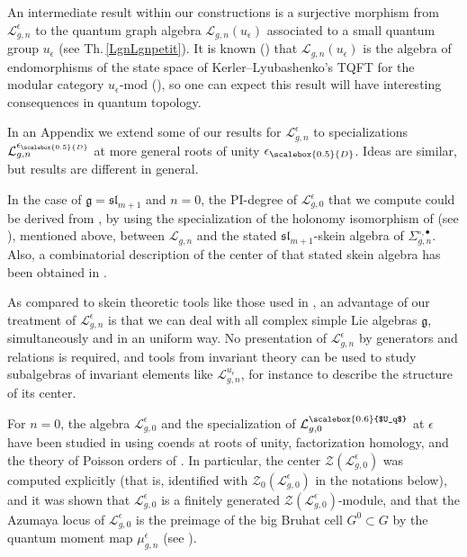 \documentclass[11pt]{amsart}
\newcommand{\e}{\epsilon}
\newcommand{\Ll}{\mathcal{L}}
\newcommand{\eD}{\epsilon_{\scalebox{0.5}{D}}}
\begin{document}
An intermediate result within our constructions is a surjective morphism from  $\Ll_{g,n}^{\e}$ to the quantum graph algebra $\Ll_{g,n}(u_\e)$ associated to a small quantum group $u_\e$ (see Th.\,\ref{LgnLgnpetit}). It is known (\cite{FaitgMCG, CF}) that $\Ll_{g,n}(u_\e)$ is the algebra of endomorphisms of the state space of Kerler--Lyubashenko's TQFT for the modular category $u_\e\text{-}\mathrm{mod}$ (\cite{KeLy}), so one can expect this result will have interesting consequences in quantum topology.

\smallskip

In an Appendix we extend some of our results for $\Ll_{g,n}^{\e}$ to specializations $\Ll_{g,n}^{\eD}$ at more general roots of unity $\eD$. Ideas are similar, but results are different in general.
\smallskip

In the case of $\mathfrak{g} = \mathfrak{sl}_{m+1}$ and $n=0$, the PI-degree of $\Ll_{g,0}^\e$ that we compute could be derived from \cite[Th.\,4]{KaruoWang}, by using the specialization of the holonomy isomorphism of \cite[Th.\,2]{BFR} (see \cite{BF}), mentioned above, between $\Ll_{g,n}$ and the stated $\mathfrak{sl}_{m+1}$-skein algebra of $\Sigma_{g,n}^{\circ,\bullet}$. Also, a combinatorial description of the center of that stated skein algebra has been obtained in \cite[Th.\,2]{KaruoWang}.

As compared to skein theoretic tools like those used in \cite{KaruoWang}, an advantage of our treatment of $\Ll_{g,n}^{\e}$ is that we can deal with all complex simple Lie algebras $\mathfrak{g}$, simultaneously and in an uniform way. No presentation of $\Ll_{g,n}^{\e}$ by generators and relations is required, and tools from invariant theory can be used to study subalgebras of invariant elements like $\Ll_{g,n}^{u_\e}$, for instance to describe the structure of its center.

\smallskip

For $n=0$, the algebra $\Ll_{g,0}^\e$ and the specialization of $\Ll_{g,0}^{{\scalebox{0.6}{$U_q$}}}$ at $\e$ have been studied in \cite{GJS} using coends at roots of unity, factorization homology, and the theory of Poisson orders of \cite{BrGo}. In particular, the center $\mathcal{Z}(\Ll_{g,0}^\e)$ was computed explicitly (that is, identified with $\mathcal{Z}_0(\Ll_{g,0}^\e)$ in the notations below), and it was shown that $\Ll_{g,0}^\e$ is a finitely generated $\mathcal{Z}(\Ll_{g,0}^\e)$-module, and that the Azumaya locus of $\Ll_{g,0}^\e$ is the preimage of the big Bruhat cell $G^0\subset G$ by the quantum moment map $\mu_{g,n}^\e$ (see \cite[Th.\,1.1]{GJS}).
\end{document}
